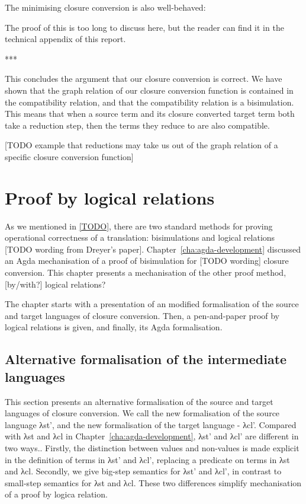\documentclass[bsc,frontabs,oneside,singlespacing,parskip,deptreport]{infthesis}
\theoremstyle{definition}
\theoremstyle{lemma}
\begin{document}

The minimising closure conversion  is also well-behaved:


The proof of this is too long to discuss here, but the reader can find
it in the technical appendix of this report.

***

This concludes the argument that our closure conversion is correct. We
have shown that the graph relation of our closure conversion function
is contained in the compatibility relation, and that the compatibility
relation is a bisimulation. This means that when a source term and its
closure converted target term both take a reduction step, then the
terms they reduce to are also compatible.

[TODO example that reductions may take us out of the graph relation of
a specific closure conversion function]

\chapter{Proof by logical relations}

As we mentioned in \ref{TODO}, there are two standard methods for
proving operational correctness of a translation: bisimulations and
logical relations [TODO wording from Dreyer's
paper]. Chapter~\ref{cha:agda-development} discussed an Agda
mechanisation of a proof of bisimulation for [TODO wording] closure
conversion. This chapter presents a mechanisation of the other proof
method, [by/with?] logical relations?

The chapter starts with a presentation of an modified formalisation
of the source and target languages of closure conversion. Then, a
pen-and-paper proof by logical relations is given, and finally, its
Agda formalisation.

\section{Alternative formalisation of the intermediate languages}
\label{sec:altern-form-interm}

This section presents an alternative formalisation of the source and
target languages of closure conversion. We call the new formalisation
of the source language λst', and the new formalisation of the target
language - λcl'. Compared with λst and λcl in
Chapter~\ref{cha:agda-development}, λst' and λcl' are different in two
ways.. Firstly, the distinction between values and non-values is
made explicit in the definition of terms in λst' and λcl', replacing a predicate on
terms in λst and λcl. Secondly, we give big-step semantics for λst'
and λcl', in contrast to small-step semantics for λst and λcl. These
two differences simplify mechanisation of a proof by logica relation.
\end{document}

